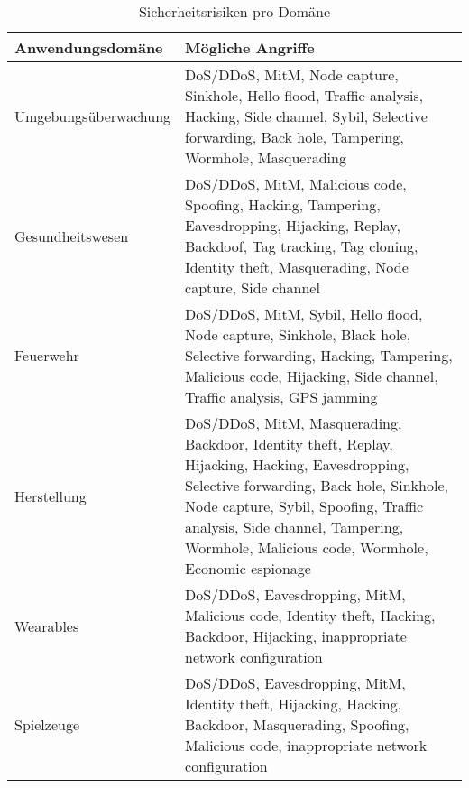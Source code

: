 \begin{table*}[t]
  \centering
  \label{tab:security-threats}
  \begin{tabularx}{\textwidth}{lX}
    \textbf{Anwendungsdomäne} & \textbf{Mögliche Angriffe}\\
    \hline
    Umgebungsüberwachung & DoS/DDoS, MitM, Node capture, Sinkhole, Hello flood,
    Traffic analysis, Hacking, Side channel, Sybil, Selective forwarding, Back
    hole, Tampering, Wormhole, Masquerading \\

    Gesundheitswesen & DoS/DDoS, MitM, Malicious code, Spoofing, Hacking,
    Tampering, Eavesdropping, Hijacking, Replay, Backdoof, Tag tracking, Tag
    cloning, Identity theft, Masquerading, Node capture, Side channel \\

    Feuerwehr & DoS/DDoS, MitM, Sybil, Hello flood, Node capture, Sinkhole,
    Black hole, Selective forwarding, Hacking, Tampering, Malicious code,
    Hijacking, Side channel, Traffic analysis, GPS jamming \\

    Herstellung & DoS/DDoS, MitM, Masquerading, Backdoor, Identity theft,
    Replay, Hijacking, Hacking, Eavesdropping, Selective forwarding, Back hole,
    Sinkhole, Node capture, Sybil, Spoofing, Traffic analysis, Side channel,
    Tampering, Wormhole, Malicious code, Wormhole, Economic espionage \\

    Wearables & DoS/DDoS, Eavesdropping, MitM, Malicious code, Identity theft,
    Hacking, Backdoor, Hijacking, inappropriate network configuration \\

    Spielzeuge & DoS/DDoS, Eavesdropping, MitM, Identity theft, Hijacking,
    Hacking, Backdoor, Masquerading, Spoofing, Malicious code, inappropriate
    network configuration
  \end{tabularx}
  \caption{Sicherheitsrisiken pro Domäne \cite{paper}}
\end{table*}
